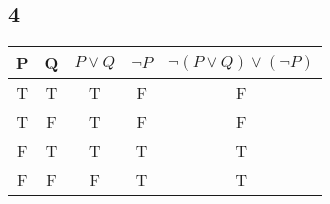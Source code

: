 \documentclass[sigconf]{article}
\begin{document}
\subsection*{4}
\begin{center}
\begin{tabular}{ |c|c|c|c|c| } 
\hline
P & Q & $P \lor Q$ & $\neg P$ & $\neg (P \lor Q) \lor (\neg P)$ \\ 
\hline
T & T & T & F & F \\
\hline
T & F & T & F & F \\
\hline
F & T & T & T & T \\
\hline
F & F & F & T & T \\
\hline
\end{tabular}
\end{center}


\end{document}
